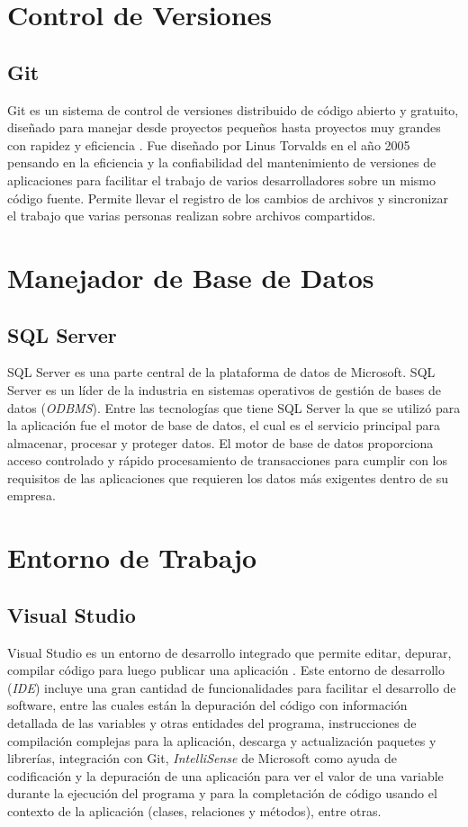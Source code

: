 \section{Control de Versiones}
\subsection{Git}
Git es un sistema de control de versiones distribuido de código abierto y gratuito, diseñado para manejar desde proyectos pequeños hasta proyectos muy grandes con rapidez y eficiencia \cite{git}. Fue diseñado por Linus Torvalds en el año 2005 pensando en la eficiencia y la confiabilidad del mantenimiento de versiones de aplicaciones para facilitar el trabajo de varios desarrolladores sobre un mismo código fuente. Permite llevar el registro de los cambios de archivos y sincronizar el trabajo que varias personas realizan sobre archivos compartidos.

\section{Manejador de Base de Datos}
\subsection{SQL Server}
SQL Server es una parte central de la plataforma de datos de Microsoft. SQL Server es un líder de la industria en sistemas operativos de gestión de bases de datos (\textit{ODBMS})\cite{sqlServerMicrosoft}. Entre las tecnologías que tiene SQL Server la que se utilizó para la aplicación fue el motor de base de datos, el cual es el servicio principal para almacenar, procesar y proteger datos. El motor de base de datos proporciona acceso controlado y rápido procesamiento de transacciones para cumplir con los requisitos de las aplicaciones que requieren los datos más exigentes dentro de su empresa. 

\section{Entorno de Trabajo}
\subsection{Visual Studio}
Visual Studio es un entorno de desarrollo integrado que permite editar, depurar, compilar código para luego publicar una aplicación \cite{visualStudioMicrosoft}. Este entorno de desarrollo (\textit{IDE}) incluye una gran cantidad de funcionalidades para facilitar el desarrollo de software, entre las cuales están la depuración del código con información detallada de las variables y otras entidades del programa, instrucciones de compilación complejas para la aplicación, descarga y actualización paquetes y librerías, integración con Git, \textit{IntelliSense} de Microsoft como ayuda de codificación y la depuración de una aplicación para ver el valor de una variable durante la ejecución del programa y para la completación de código usando el contexto de la aplicación (clases, relaciones y métodos), entre otras.


